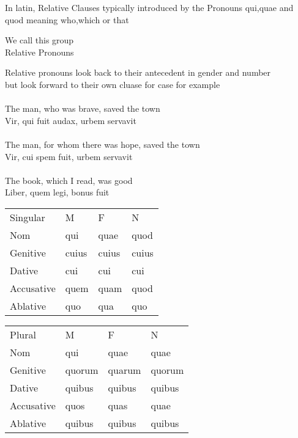 In latin, Relative Clauses typically introduced by the Pronouns
qui,quae and quod meaning who,which or that
\begin{center}
  We call this group \\ 
  \Large{Relative Pronouns}
\end{center}
Relative pronouns look back to their antecedent in gender 
and number \\
but look forward to their own cluase for case for example \\ \\ 
The man, who was brave, saved the town \\ 
Vir, qui fuit audax, urbem servavit \\ \\ 
The man, for whom there was hope, saved the town \\ 
Vir, cui spem fuit, urbem servavit \\ \\ 
The book, which I read, was good  \\
Liber, quem legi, bonus fuit 
\begin{table}[!htb]
  \begin{center}
    \begin{tabular}{llll}
      Singular & M & F & N \\ 
      Nom & qui & quae & quod \\  
      Genitive & cuius & cuius & cuius \\ 
      Dative & cui & cui & cui \\ 
      Accusative & quem & quam & quod \\ 
      Ablative & quo & qua & quo 
    \end{tabular}
  \end{center}
  \begin{center}
    \begin{tabular}{llll}
      Plural & M & F & N \\ 
      Nom & qui & quae & quae \\  
      Genitive & quorum & quarum & quorum \\ 
      Dative & quibus & quibus & quibus \\ 
      Accusative & quos  & quas & quae \\ 
      Ablative & quibus & quibus & quibus
    \end{tabular}
  \end{center}
\end{table}
